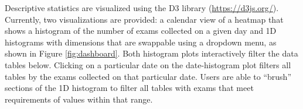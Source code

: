 Descriptive statistics are visualized using the D3 library (\href{https://d3js.org/}{https://d3js.org/}). Currently, two visualizations are provided: a calendar view of a heatmap that shows a histogram of the number of exams collected on a given day and 1D histograms with dimensions that are swappable using a dropdown menu, as shown in Figure \ref{fig:dashboard}. Both histogram plots interactively filter the data tables below. Clicking on a particular date on the date-histogram plot filters all tables by the exams collected on that particular date. Users are able to ``brush'' sections of the 1D histogram to filter all tables with exams that meet requirements of values within that range.  